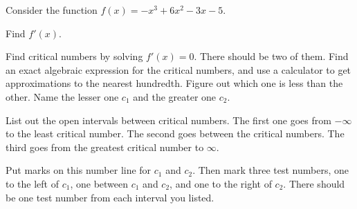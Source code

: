 
Consider the function $f(x) = -x^3 + 6 x^2 - 3 x - 5$.

\begin{ProblemSet}

 \begin{Problem}
  Find $f'(x)$.
 \end{Problem}

 \begin{Problem}[pencil space=3in]
  Find critical numbers by solving $f'(x) = 0$.
  There should be two of them.
  Find an exact algebraic expression for the critical numbers, and use a calculator to get approximations to the nearest hundredth.
  Figure out which one is less than the other.
  Name the lesser one $c_1$ and the greater one $c_2$.
 \end{Problem}

 \begin{Problem}
  List out the open intervals between critical numbers.
  The first one goes from $-\infty$ to the least critical number.
  The second goes between the critical numbers.
  The third goes from the greatest critical number to $\infty$.
 \end{Problem}

 \newpage

 \begin{Problem}[pencil space=0in]
  Put marks on this number line for $c_1$ and $c_2$.
  Then mark three test numbers, one to the left of $c_1$,
  one between $c_1$ and $c_2$,
  and one to the right of $c_2$.
  There should be one test number from each interval you listed.

 \end{Problem}


\end{ProblemSet}
